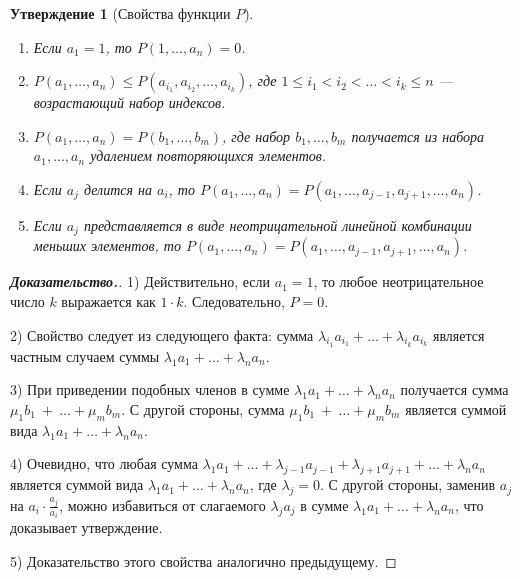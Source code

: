 \documentclass[12pt]{article}
\newtheorem{proposition}[theorem]{Утверждение}
\theoremstyle{definition}
\begin{document}
\begin{proposition}[Свойства функции $P$]{\ }
\label{propertiesOfP}
\begin{enumerate}
    \item Если $a_1 = 1$, то $P(1, \dots, a_n) = 0$.
    \item $P(a_1, \dots, a_n) \le P(a_{i_1} , a_{i_2}, \dots, a_{i_k})$, где $1 \le i_1 < i_2 < \dots < i_k \le n$ --- возрастающий набор индексов.
    \item $P(a_1, \dots, a_n) = P(b_1, \dots, b_m)$, где набор $b_1, \dots, b_m$ получается из набора $a_1, \dots, a_n$ удалением повторяющихся элементов.
    \item Если $a_j$ делится на $a_i$, то $P(a_1, \dots, a_n) = P(a_1, \dots, a_{j - 1}, a_{j + 1}, \dots, a_n)$.
    
    \item Если $a_j$ представляется в виде неотрицательной линейной комбинации меньших элементов, то $P(a_1, \dots, a_n) = P(a_1, \dots, a_{j - 1}, a_{j + 1}, \dots, a_n)$.
\end{enumerate}
\end{proposition}
\begin{proof}[\textbf{Доказательство.}]
1) Действительно, если $a_1 = 1$, то любое неотрицательное число $k$ выражается как $1 \cdot k$. Следовательно, $P = 0$.

2) Свойство следует из следующего факта: сумма $\lambda_{i_1} a_{i_1} + \dots + \lambda_{i_k} a_{i_k}$ является частным случаем суммы $\lambda_1 a_1 + \dots + \lambda_n a_n$.

3) При приведении подобных членов в сумме $\lambda_1 a_1 + \dots + \lambda_n a_n$ получается сумма $\mu_1 b_1~+~\dots + \mu_m b_m$. С другой стороны, сумма $\mu_1 b_1~+~\dots + \mu_m b_m$ является суммой вида $\lambda_1 a_1 + \dots + \lambda_n a_n$.

4) Очевидно, что любая сумма $\lambda_1 a_1 + \dots + \lambda_{j - 1} a_{j - 1} + \lambda_{j + 1} a_{j + 1} + \dots + \lambda_n a_n$ является суммой вида $\lambda_1 a_1 + \dots + \lambda_n a_n$, где $\lambda_j = 0$. С другой стороны, заменив $a_j$ на $a_i \cdot \frac{a_j}{a_i}$, можно избавиться от слагаемого $\lambda_j a_j$ в сумме $\lambda_1 a_1 + \dots + \lambda_n a_n$, что доказывает утверждение.

5) Доказательство этого свойства аналогично предыдущему.
\end{proof}
\end{document}
